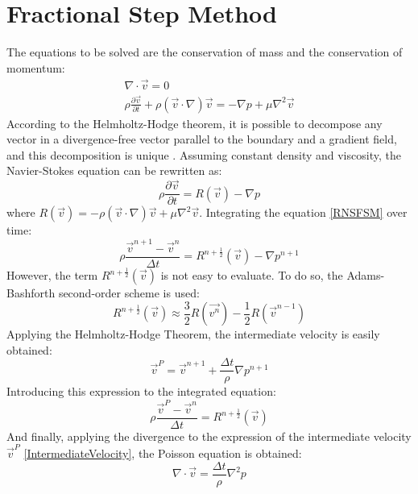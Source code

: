 \chapter{Fractional Step Method}
The equations to be solved are the conservation of mass and the conservation of momentum:
\begin{equation}
\begin{aligned}
\nabla\cdot\vec{v}=0 \\
\rho\frac{\partial\vec{v}}{\partial t}+\rho\left(\vec{v}\cdot\nabla\right)\vec{v}=-\nabla p+\mu\nabla^{2}\vec{v}
\end{aligned}
\end{equation}
According to the Helmholtz-Hodge theorem, it is possible to decompose any vector in a divergence-free vector parallel to the boundary and a gradient field, and this decomposition is unique \cite{CTTC}.
Assuming constant density and viscosity, the Navier-Stokes equation can be rewritten as:
\begin{equation}
\rho\frac{\partial\vec{v}}{\partial t}=R\left(\vec{v}\right)-\nabla p
\label{RNSFSM}
\end{equation}
where $R\left(\vec{v}\right)=-\rho\left(\vec{v}\cdot\nabla\right)\vec{v}+\mu\nabla^{2}\vec{v}$.
Integrating the equation \ref{RNSFSM} over time:
\begin{equation}
\rho\frac{\vec{v}^{n+1}-\vec{v}^{n}}{\Delta t}=R^{n+\frac{1}{2}}\left(\vec{v}\right)-\nabla p^{n+1}
\end{equation}
However, the term $R^{n+\frac{1}{2}}\left(\vec{v}\right)$ is not easy to evaluate. To do so, the Adams-Bashforth second-order scheme is used:
\begin{equation}
R^{n+\frac{1}{2}}\left(\vec{v}\right)\approx\frac{3}{2}R\left(\vec{v^{n}}\right)-\frac{1}{2}R\left(\vec{v}^{n-1}\right)
\end{equation}
Applying the Helmholtz-Hodge Theorem, the intermediate velocity is easily obtained:
\begin{equation}
\vec{v}^{P}=\vec{v}^{n+1}+\frac{\Delta t}{\rho}\nabla p^{n+1}
\label{IntermediateVelocity}
\end{equation}
Introducing this expression to the integrated equation:
\begin{equation}
\rho\frac{\vec{v}^{P}-\vec{v}^{n}}{\Delta t}=R^{n+\frac{1}{2}}\left(\vec{v}\right)
\label{IntermediatewithR}
\end{equation}
And finally, applying the divergence to the expression of the intermediate velocity $\vec{v}^{P}$ \ref{IntermediateVelocity}, the Poisson equation is obtained:
\begin{equation}
\nabla\cdot\vec{v}=\frac{\Delta t}{\rho}\nabla^{2}p
\label{Poisson}
\end{equation}

